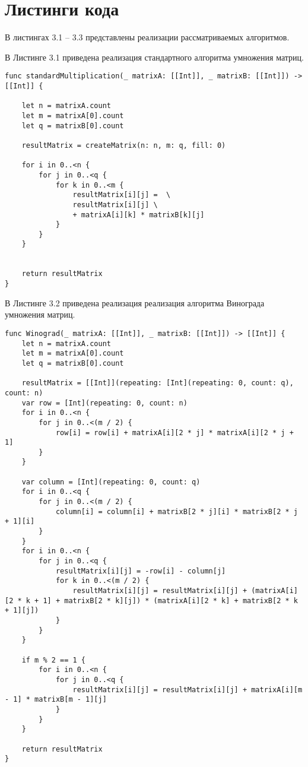 \section{Листинги кода}

В листингах 3.1 -- 3.3 представлены реализации рассматриваемых алгоритмов.

\hspace{0.6cm}В Листинге 3.1 приведена реализация стандартного алгоритма умножения матриц.
\begin{lstlisting}[caption=Функция стандартного умножения матриц]
func standardMultiplication(_ matrixA: [[Int]], _ matrixB: [[Int]]) -> [[Int]] {

    let n = matrixA.count
    let m = matrixA[0].count
    let q = matrixB[0].count
    
    resultMatrix = createMatrix(n: n, m: q, fill: 0)
    
    for i in 0..<n {
        for j in 0..<q {
            for k in 0..<m {
                resultMatrix[i][j] =  \
                resultMatrix[i][j] \
                + matrixA[i][k] * matrixB[k][j]
            }
        }
    }
    
    
    return resultMatrix
}
\end{lstlisting}

\newpage
\hspace{0.6cm}В Листинге 3.2 приведена реализация реализация алгоритма Винограда умножения матриц.
\begin{lstlisting}[caption=Функция алгоритма Винограда умножения матриц]
func Winograd(_ matrixA: [[Int]], _ matrixB: [[Int]]) -> [[Int]] {
    let n = matrixA.count
    let m = matrixA[0].count
    let q = matrixB[0].count
    
    resultMatrix = [[Int]](repeating: [Int](repeating: 0, count: q), count: n)
    var row = [Int](repeating: 0, count: n)
    for i in 0..<n {
        for j in 0..<(m / 2) {
            row[i] = row[i] + matrixA[i][2 * j] * matrixA[i][2 * j + 1]
        }
    }
    
    var column = [Int](repeating: 0, count: q)
    for i in 0..<q {
        for j in 0..<(m / 2) {
            column[i] = column[i] + matrixB[2 * j][i] * matrixB[2 * j + 1][i]
        }
    }
    for i in 0..<n {
        for j in 0..<q {
            resultMatrix[i][j] = -row[i] - column[j]
            for k in 0..<(m / 2) {
                resultMatrix[i][j] = resultMatrix[i][j] + (matrixA[i][2 * k + 1] + matrixB[2 * k][j]) * (matrixA[i][2 * k] + matrixB[2 * k + 1][j])
            }
        }
    }
    
    if m % 2 == 1 {
        for i in 0..<n {
            for j in 0..<q {
                resultMatrix[i][j] = resultMatrix[i][j] + matrixA[i][m - 1] * matrixB[m - 1][j]
            }
        }
    }
    
    return resultMatrix
}
\end{lstlisting}

